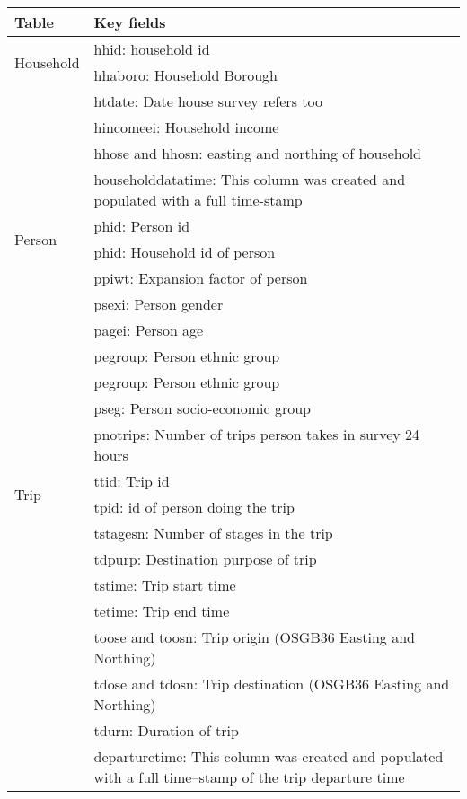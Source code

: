 \newpage

\begin{center}
\begin{table}[h!]
    \begin{tabular}{ | p{2.2cm} | p{12cm} |}
    \hline
    \textbf{Table} & \textbf{Key fields} \\ \hline
    \multirow{2}{*}{Household} & hhid: household id \\
     & hhaboro: Household Borough \\
     & htdate: Date house survey refers too \\
     & hincomeei: Household income \\
     & hhose and hhosn: easting and northing of household \\ 
     & householddatatime: This column was created and populated with a full time-stamp \\ \hline
   \multirow{2}{*}{Person} & phid: Person id \\
     & phid: Household id of person \\
     & ppiwt: Expansion factor of person \\
     & psexi: Person gender \\
     & pagei: Person age \\
     & pegroup: Person ethnic group \\
     & pegroup: Person ethnic group \\
     & pseg: Person socio-economic group \\
     & pnotrips: Number of trips person takes in survey 24 hours \\ \hline
     \multirow{2}{*}{Trip} & ttid: Trip id \\
     & tpid: id of person doing the trip \\
     & tstagesn: Number of stages in the trip  \\
     & tdpurp: Destination purpose of trip \\
     & tstime: Trip start time \\
     & tetime: Trip end time \\
     & toose and toosn: Trip origin (OSGB36 Easting and Northing) \\
     & tdose and tdosn: Trip destination (OSGB36 Easting and Northing) \\
     & tdurn: Duration of trip \\ 
     & departuretime: This column was created and populated with a full time--stamp of the trip departure time \\

\end{tabular}
\end{table}
\end{center}
